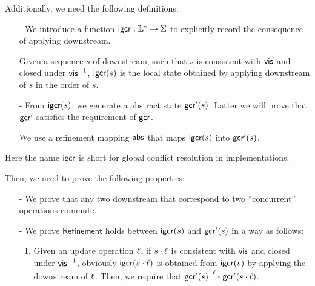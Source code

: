 {    %

Additionally, we need the following definitions:

\begin{itemize}
\setlength{\itemsep}{0.5pt}
\item[-] We introduce a function $\mathsf{igcr}: \mathbb{L}^* \rightarrow \Sigma$ to explicitly record the consequence of applying downstream.

Given a sequence $s$ of downstream, such that $s$ is consistent with $\mathsf{vis}$ and closed under $\mathsf{vis}^{-1}$, $\mathsf{igcr}(s)$ is the local state obtained by applying downstream of $s$ in the order of $s$.

\item[-] From $\mathsf{igcr}(s)$, we generate a abstract state $\mathsf{gcr}'(s)$. Latter we will prove that $\mathsf{gcr}'$ satisfies the requirement of $\mathsf{gcr}$.

    We use a refinement mapping $\mathsf{abs}$ that maps $\mathsf{igcr}(s)$ into $\mathsf{gcr}'(s)$. %
\end{itemize}


Here the name $\mathsf{igcr}$ is short for global conflict resolution in implementations.

Then, we need to prove the following properties:

\begin{itemize}
\setlength{\itemsep}{0.5pt}
\item[-] We prove that any two downstream that correspond to two ``concurrent'' operations commute.

\item[-] We prove $\mathsf{Refinement}$ holds between $\mathsf{igcr}(s)$ and $\mathsf{gcr}'(s)$ in a way as follows:

\begin{enumerate}
\item Given an update operation $\ell$, if $s \cdot \ell$ is consistent with $\mathsf{vis}$ and closed under $\mathsf{vis}^{-1}$, obviously $\mathsf{igcr}(s \cdot \ell)$ is obtained from $\mathsf{igcr}(s)$ by applying the downstream of $\ell$. Then, we require that $\mathsf{gcr}'(s)\xRightarrow{\ensuremath{\ell}}\mathsf{gcr}'(s \cdot \ell)$.


\end{enumerate}
\end{itemize}}
